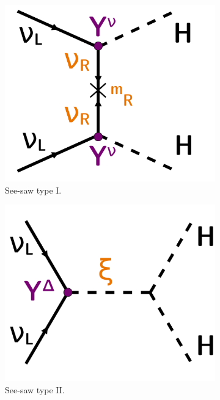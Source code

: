 \begin{figure}[h]
  \centering
  \begin{subfigure}[t]{0.32\textwidth}
    \centering
    \includegraphics[height=0.7\textwidth]{neutrinophysics/fig_neutrinophysics/seesaw_I.pdf}
    \captionsetup{justification=justified}
    \caption{See-saw type I.
      \label{subfig:diagram_seesawI}}
  \end{subfigure}
  \hfill
  \begin{subfigure}[t]{0.32\textwidth}
    \centering
    \includegraphics[height=0.7\textwidth]{neutrinophysics/fig_neutrinophysics/seesaw_II.pdf}
    \captionsetup{justification=justified}
    \caption{See-saw type II.
      \label{subfig:diagram_seesawII}}
  \end{subfigure}
  \hfill
  \begin{subfigure}[t]{0.32\textwidth}

\end{subfigure}
\end{figure}
